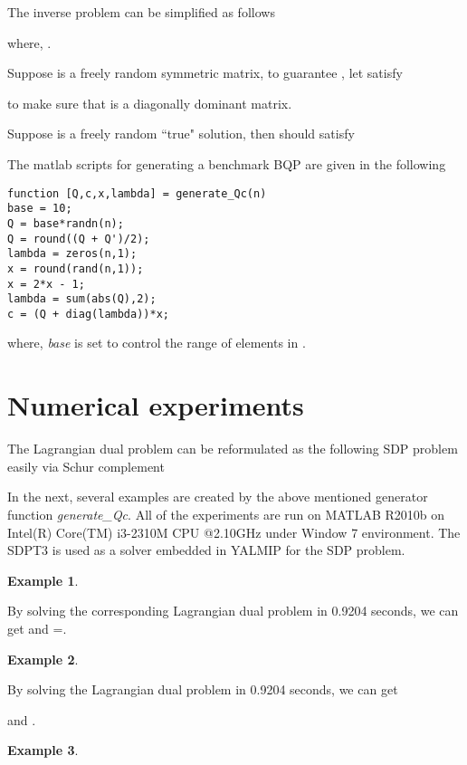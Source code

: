 \documentclass[conference]{IEEEtran}
\newtheorem{example}{Example}
\begin{document}
The inverse problem can be simplified as follows

where, .

Suppose  is a freely random symmetric matrix, to guarantee , let  satisfy

to make sure that  is a diagonally dominant matrix.

Suppose  is a freely random ``true" solution, then  should satisfy


The matlab scripts for generating a benchmark BQP are given in the following
\begin{verbatim}
function [Q,c,x,lambda] = generate_Qc(n)
base = 10;
Q = base*randn(n);
Q = round((Q + Q')/2);
lambda = zeros(n,1);
x = round(rand(n,1));
x = 2*x - 1;
lambda = sum(abs(Q),2);
c = (Q + diag(lambda))*x;
\end{verbatim}
where, \textit{base} is set to control the range of elements in .\\
\section{Numerical experiments}
The Lagrangian dual problem can be reformulated as the following SDP problem easily via Schur complement \cite{boyd1994linear}


In the next, several examples are created by the above mentioned generator function \textit{generate\_Qc}.
All of the experiments are run on MATLAB R2010b on Intel(R) Core(TM) i3-2310M CPU @2.10GHz under Window 7 environment.
The SDPT3 \cite{toh1999sdpt3} is used as a solver embedded in YALMIP \cite{lofberg2004yalmip} for the SDP problem.
\begin{example}\label{exa1}

\end{example}
By solving the corresponding Lagrangian dual problem in 0.9204 seconds, we can get  and  =.

\begin{strip}
\begin{example}\label{exa2}
 
\end{example}
\end{strip}

By solving the Lagrangian dual problem  in 0.9204 seconds, we can get

and  .

\begin{strip}
\begin{example}\label{exa3}
\setcounter{MaxMatrixCols}{20}
 
\end{example}
\setlength{\parskip}{4pt}
\captionsetup[table]{labelformat=simple ,labelsep=quad}
\renewcommand{\thetable}{\arabic{table}}
\end{strip}
\end{document}
